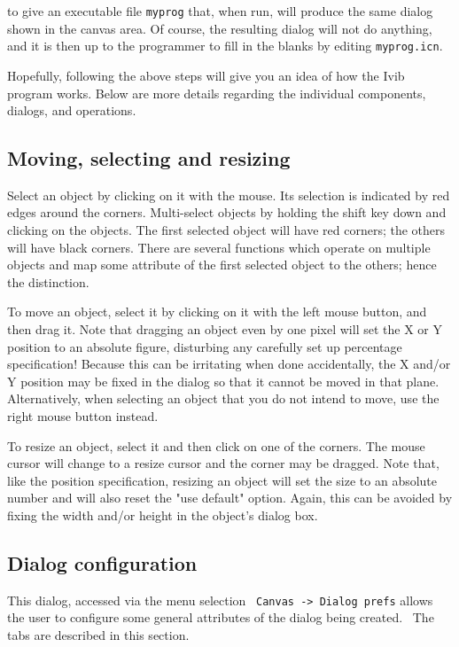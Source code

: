 
\noindent
to give an executable file \texttt{myprog} that, when run, will produce
the same dialog shown in the canvas area. Of course, the resulting
dialog will not do anything, and it is then up to the programmer to
fill in the blanks by editing \texttt{myprog.icn}.

Hopefully, following the above steps will give you an idea of how the
Ivib program works. Below are more details regarding the individual
components, dialogs, and operations.

\subsection{Moving, selecting and resizing}

Select an object by clicking on it with the mouse. Its selection is
indicated by red edges around the corners. Multi-select objects by
holding the shift key down and clicking on the objects. The first
selected object will have red corners; the others will have black
corners. There are several functions which operate on multiple objects
and map some attribute of the first selected object to the others;
hence the distinction.

To move an object, select it by clicking on it with the left mouse
button, and then drag it. Note that dragging an object even by one
pixel will set the X or Y position to an absolute figure, disturbing
any carefully set up percentage specification! Because this can be
irritating when done accidentally, the X and/or Y position may be fixed
in the dialog so that it cannot be moved in that plane. Alternatively,
when selecting an object that you do not intend to move, use the right
mouse button instead.

To resize an object, select it and then click on one of the corners. The
mouse cursor will change to a resize cursor and the corner may be
dragged. Note that, like the position specification, resizing an object
will set the size to an absolute number and will also reset the
"use default" option. Again, this can be
avoided by fixing the width and/or height in the object's dialog box.

\subsection{Dialog configuration}

This dialog, accessed via the menu selection \ \texttt{Canvas
-{\textgreater} Dialog prefs} allows the user to configure some general
attributes of the dialog being created. \ The tabs are described in
this section.

